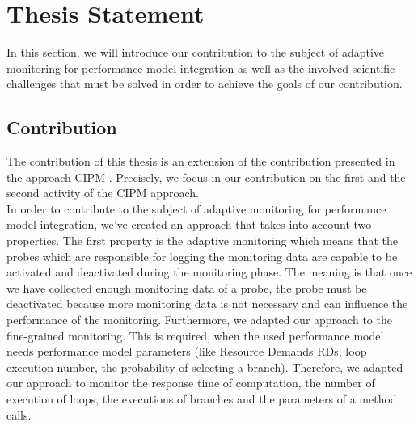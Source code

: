 
\chapter{Thesis Statement}
\label{ch:Thesis Statement}
In this section, we will introduce our contribution to the subject of adaptive monitoring for performance model integration as well as the involved scientific challenges that must be solved in order to achieve the goals of our contribution. 

\section{Contribution}
\label{sec:Contribution}
The contribution of this thesis is an extension of the contribution presented in the approach CIPM \cite{mazkatli2018continuous}. Precisely, we focus in our contribution on the first and the second activity of the CIPM approach. \\

In order to contribute to the subject of adaptive monitoring for performance model integration, we’ve created an approach that takes into account two properties. The first property is the adaptive monitoring which means that the probes which are responsible for logging the monitoring data are capable to be activated and deactivated during the monitoring phase. The meaning is that once we have collected enough monitoring data of a probe, the probe must be deactivated because more monitoring data is not necessary and can influence the performance of the monitoring.   Furthermore, we adapted our approach to the fine-grained monitoring. This is required, when the used performance model needs performance model parameters (like Resource Demands RDs, loop execution number, the probability of selecting a branch). Therefore, we adapted our approach to monitor the response time of computation, the number of execution of loops, the executions of branches and the parameters of a method calls.\\

